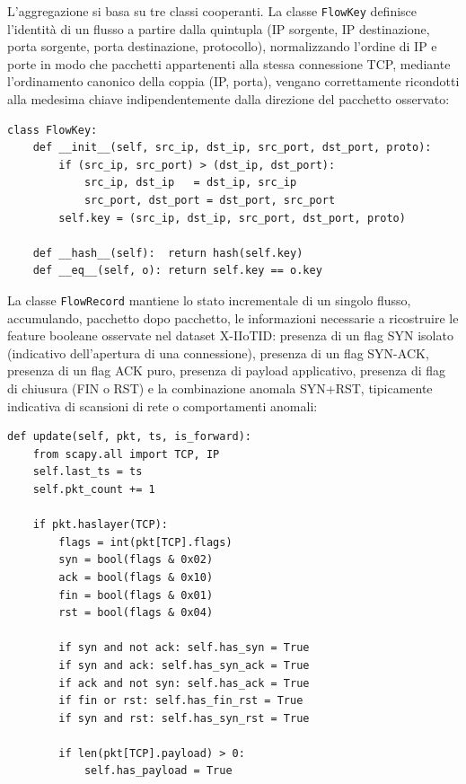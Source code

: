 \documentclass[12pt,a4paper]{report}
\begin{document}
L'aggregazione si basa su tre classi cooperanti. La classe \texttt{FlowKey} definisce l'identità di un flusso a partire dalla quintupla (IP sorgente, IP destinazione, porta sorgente, porta destinazione, protocollo), normalizzando l'ordine di IP e porte in modo che pacchetti appartenenti alla stessa connessione TCP, mediante l'ordinamento canonico della coppia (IP, porta), vengano correttamente ricondotti alla medesima chiave indipendentemente dalla direzione del pacchetto osservato:

\begin{lstlisting}[caption={Normalizzazione della direzione del flusso (\texttt{ACDBliveScript.py})}]
class FlowKey:
    def __init__(self, src_ip, dst_ip, src_port, dst_port, proto):
        if (src_ip, src_port) > (dst_ip, dst_port):
            src_ip, dst_ip   = dst_ip, src_ip
            src_port, dst_port = dst_port, src_port
        self.key = (src_ip, dst_ip, src_port, dst_port, proto)

    def __hash__(self):  return hash(self.key)
    def __eq__(self, o): return self.key == o.key
\end{lstlisting}

La classe \texttt{FlowRecord} mantiene lo stato incrementale di un singolo flusso, accumulando, pacchetto dopo pacchetto, le informazioni necessarie a ricostruire le feature booleane osservate nel dataset X-IIoTID: presenza di un flag SYN isolato (indicativo dell'apertura di una connessione), presenza di un flag SYN-ACK, presenza di un flag ACK puro, presenza di payload applicativo, presenza di flag di chiusura (FIN o RST) e la combinazione anomala SYN+RST, tipicamente indicativa di scansioni di rete o comportamenti anomali:

\begin{lstlisting}[caption={Aggiornamento dello stato del flusso a partire dai flag TCP (\texttt{ACDBliveScript.py})}]
def update(self, pkt, ts, is_forward):
    from scapy.all import TCP, IP
    self.last_ts = ts
    self.pkt_count += 1

    if pkt.haslayer(TCP):
        flags = int(pkt[TCP].flags)
        syn = bool(flags & 0x02)
        ack = bool(flags & 0x10)
        fin = bool(flags & 0x01)
        rst = bool(flags & 0x04)

        if syn and not ack: self.has_syn = True
        if syn and ack: self.has_syn_ack = True
        if ack and not syn: self.has_ack = True
        if fin or rst: self.has_fin_rst = True
        if syn and rst: self.has_syn_rst = True

        if len(pkt[TCP].payload) > 0:
            self.has_payload = True
\end{lstlisting}
\end{document}

